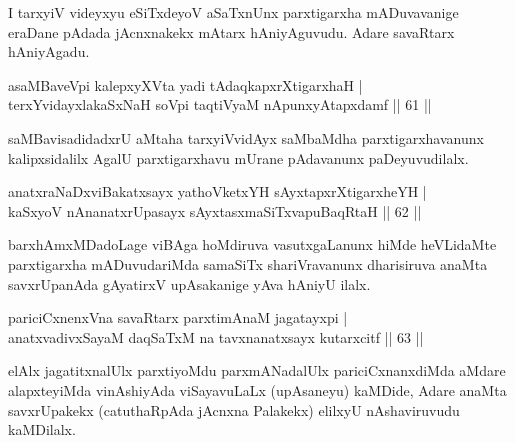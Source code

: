 \begin{artha} 
I tarxyiV videyxyu eSiTxdeyoV aSaTxnUnx parxtigarxha mADuvavanige 
eraDane pAdada jAcnxnakekx mAtarx hAniyAguvudu. Adare savaRtarx\break 
hAniyAgadu.
\end{artha}

\begin{shl}
asaMBaveV\s pi kalepxyXVta yadi tAdaqkapxrXtigarxhaH | \\
terxYvidayxlakaSxNaH soV\s pi taqtiVyaM nA\s \s punxyAtapxdamf \hfill ||  61 || 
\end{shl}

\begin{artha} 
saMBavisadidadxrU aMtaha tarxyiVvidAyx saMbaMdha parxtigarxhavanunx 
kalipxsidalilx AgalU parxtigarxhavu mUrane pAdavanunx paDeyuvudilalx.
\end{artha}


\begin{shl}
anatxraNaDxviBakatxsayx yathoVketxYH sAyxtapxrXtigarxheYH | \\
kaSxyoV nAnanatxrUpasayx sAyxtasxmaSiTxvapuBaqRtaH \hfill||  62 || 
\end{shl}

\begin{artha} 
barxhAmxMDadoLage viBAga hoMdiruva vasutxgaLanunx hiMde heVLidaMte 
parxtigarxha mADuvudariMda samaSiTx shariVravanunx dharisiruva anaMta 
savxrUpanAda gAyatirxV upAsakanige yAva hAniyU ilalx.
\end{artha}


\begin{shl}
pariciCxnenxVna savaRtarx parxtimAnaM jagatayxpi | \\
anatxvadivxSayaM daqSaTxM na tavxnanatxsayx kutarxcitf \hfill||  63 || 
\end{shl}

\begin{artha} 
elAlx jagatitxnalUlx parxtiyoMdu parxmANadalUlx pariciCxnanxdiMda 
aMdare alapxteyiMda vinAshiyAda viSayavuLaLx (upAsaneyu) kaMDide, 
Adare anaMta savxrUpakekx (catuthaRpAda jAcnxna Palakekx) elilxyU 
nAshaviruvudu kaMDilalx.
\end{artha}


